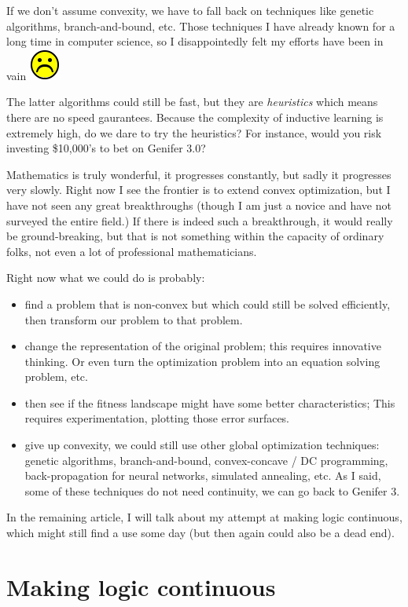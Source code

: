 \documentclass[12pt]{article}
\newcommand*\sadface{\includegraphics[scale=0.25]{face-sad.png}}
\begin{document}
If we don't assume convexity, we have to fall back on techniques like genetic algorithms, branch-and-bound, etc.  Those techniques I have already known for a long time in computer science, so I disappointedly felt my efforts have been in vain \sadface

The latter algorithms could still be fast, but they are \textit{heuristics} which means there are no speed gaurantees.  Because the complexity of inductive learning is extremely high, do we dare to try the heuristics?  For instance, would you risk investing \$10,000's to bet on Genifer 3.0?

Mathematics is truly wonderful, it progresses constantly, but sadly it progresses very slowly.  Right now I see the frontier is to extend convex optimization, but I have not seen any great breakthroughs (though I am just a novice and have not surveyed the entire field.)  If there is indeed such a breakthrough, it would really be ground-breaking, but that is not something within  the capacity of ordinary folks, not even a lot of professional mathematicians.

Right now what we could do is probably:
\begin{itemize}
\item find a problem that is non-convex but which could still be solved efficiently, then transform our problem to that problem.
\item change the representation of the original problem;  this requires innovative thinking.  Or even turn the optimization problem into an equation solving problem, etc.
\item then see if the fitness landscape might have some better characteristics;  This requires experimentation, plotting those error surfaces.
\item give up convexity, we could still use other global optimization techniques:  genetic algorithms, branch-and-bound, convex-concave / DC programming, back-propagation for neural networks, simulated annealing, etc.  As I said, some of these techniques do not need continuity, we can go back to Genifer 3.
\end{itemize}

In the remaining article, I will talk about my attempt at making logic continuous, which might still find a use some day (but then again could also be a dead end).

\section{Making logic continuous}
\end{document}
